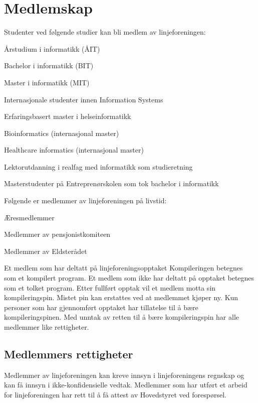\chapter{Medlemskap}
\label{chap:medlemskap}
Studenter ved følgende studier kan bli medlem av linjeforeningen: 
\begin{liste}
	\item Årstudium i informatikk (ÅIT)
	\item Bachelor i informatikk (BIT)
	\item Master i informatikk (MIT)
	\item Internasjonale studenter innen Information Systems
	\item Erfaringsbasert master i helseinformatikk		%
	\item Bioinformatics (internasjonal master)		%
	\item Healthcare informatics (internasjonal master)	%
	\item Lektorutdanning i realfag med informatikk som studieretning %
	\item Masterstudenter på Entreprenørskolen som tok bachelor i informatikk %
\end{liste} 
Følgende er medlemmer av linjeforeningen på livstid:
\begin{liste}
	\item Æresmedlemmer
	\item Medlemmer av pensjonistkomiteen
	\item Medlemmer av Eldsterådet
\end{liste}

Et medlem som har deltatt på linjeforeningsopptaket Kompileringen betegnes som et kompilert program. Et medlem som ikke har deltatt på opptaket betegnes som et tolket program. Etter fullført opptak vil et medlem motta sin kompileringspin. Mistet pin kan erstattes ved at medlemmet kjøper ny. Kun personer som har gjennomført opptaket har tillatelse til å bære kompileringspinen. Med unntak av retten til å bære kompileringspin har alle medlemmer like rettigheter. %

\section{Medlemmers rettigheter}

Medlemmer av linjeforeningen kan kreve innsyn i linjeforeningens regnskap og kan få innsyn i ikke-konfidensielle vedtak. Medlemmer som har utført et arbeid for linjeforeningen har rett til å få attest av Hovedstyret ved forespørsel.

